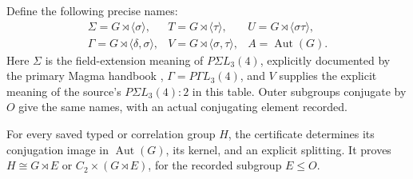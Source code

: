 \documentclass[11pt]{article}
\newcommand{\Aut}{\operatorname{Aut}}\newcommand{\Cor}{\operatorname{Cor}}
\begin{document}
Define the following precise names:
\[
 \begin{array}{lll}
 \Sigma=G\rtimes\langle\sigma\rangle,&
 T=G\rtimes\langle\tau\rangle,&
 U=G\rtimes\langle\sigma\tau\rangle,\\
 \Gamma=G\rtimes\langle\delta,\sigma\rangle,&
 V=G\rtimes\langle\sigma,\tau\rangle,& A=\Aut(G).
 \end{array}                                                   \tag{1}
\]
Here $\Sigma$ is the field-extension meaning of $P\Sigma L_3(4)$,
explicitly documented by the primary Magma handbook \cite{Magma},
$\Gamma=P\Gamma L_3(4)$, and $V$ supplies the explicit meaning of the
source's $P\Sigma L_3(4):2$ in this table. Outer subgroups conjugate by
$O$ give the same names, with an actual conjugating element recorded.

\begin{lemma}
For every saved typed or correlation group $H$, the certificate determines
its conjugation image in $\Aut(G)$, its kernel, and an explicit splitting.
It proves $H\cong G\rtimes E$ or $C_2\times(G\rtimes E)$, for the
recorded subgroup $E\leq O$.
\end{lemma}
\end{document}
